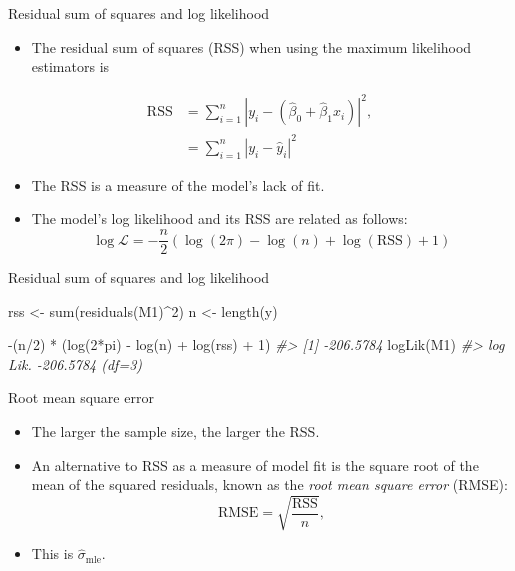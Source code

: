 \documentclass[
  10pt,
  ignorenonframetext,
]{beamer}
\newenvironment{Shaded}{\begin{snugshade}}{\end{snugshade}}
\newcommand{\CommentTok}[1]{\textcolor[rgb]{0.56,0.35,0.01}{\textit{#1}}}
\newcommand{\DecValTok}[1]{\textcolor[rgb]{0.00,0.00,0.81}{#1}}
\newcommand{\FunctionTok}[1]{\textcolor[rgb]{0.00,0.00,0.00}{#1}}
\newcommand{\NormalTok}[1]{#1}
\newcommand{\OtherTok}[1]{\textcolor[rgb]{0.56,0.35,0.01}{#1}}
\newcommand{\SpecialCharTok}[1]{\textcolor[rgb]{0.00,0.00,0.00}{#1}}
\providecommand{\tightlist}{%
  \setlength{\itemsep}{0pt}\setlength{\parskip}{0pt}}
\begin{document}
\begin{frame}{Residual sum of squares and log likelihood}
\protect\hypertarget{residual-sum-of-squares-and-log-likelihood}{}
\begin{itemize}
\tightlist
\item
  The residual sum of squares (RSS) when using the maximum likelihood
  estimators is
\end{itemize}

\[
\begin{aligned}
\text{RSS} &= \sum_{i=1}^n |y_i - (\hat{\beta}_0 + \hat{\beta}_1 x_i)|^2,\\
           &= \sum_{i=1}^n |y_i - \hat{y}_i|^2
\end{aligned}
\]

\begin{itemize}
\tightlist
\item
  The RSS is a measure of the model's lack of fit.
\item
  The model's log likelihood and its RSS are related as follows: \[
  \log \mathcal{L} = -\frac{n}{2}\left(\log(2\pi) - \log(n) + \log(\text{RSS}) + 1 \right) 
  \]
\end{itemize}
\end{frame}

\begin{frame}[fragile]{Residual sum of squares and log likelihood}
\protect\hypertarget{residual-sum-of-squares-and-log-likelihood-1}{}
\begin{Shaded}
\begin{Highlighting}[]
\NormalTok{rss }\OtherTok{\textless{}{-}} \FunctionTok{sum}\NormalTok{(}\FunctionTok{residuals}\NormalTok{(M1)}\SpecialCharTok{\^{}}\DecValTok{2}\NormalTok{)}
\NormalTok{n }\OtherTok{\textless{}{-}} \FunctionTok{length}\NormalTok{(y)}

\SpecialCharTok{{-}}\NormalTok{(n}\SpecialCharTok{/}\DecValTok{2}\NormalTok{) }\SpecialCharTok{*}\NormalTok{ (}\FunctionTok{log}\NormalTok{(}\DecValTok{2}\SpecialCharTok{*}\NormalTok{pi) }\SpecialCharTok{{-}} \FunctionTok{log}\NormalTok{(n) }\SpecialCharTok{+} \FunctionTok{log}\NormalTok{(rss) }\SpecialCharTok{+} \DecValTok{1}\NormalTok{)}
\CommentTok{\#\textgreater{} [1] {-}206.5784}
\FunctionTok{logLik}\NormalTok{(M1)}
\CommentTok{\#\textgreater{} \textquotesingle{}log Lik.\textquotesingle{} {-}206.5784 (df=3)}
\end{Highlighting}
\end{Shaded}
\end{frame}

\begin{frame}{Root mean square error}
\protect\hypertarget{root-mean-square-error}{}
\begin{itemize}
\tightlist
\item
  The larger the sample size, the larger the RSS.
\item
  An alternative to RSS as a measure of model fit is the square root of
  the mean of the squared residuals, known as the \emph{root mean square
  error} (RMSE): \[
  \text{RMSE} = \sqrt{\frac{\text{RSS}}{n}},
  \]
\item
  This is \(\hat{\sigma}_{\text{mle}}\).
\end{itemize}
\end{frame}
\end{document}
